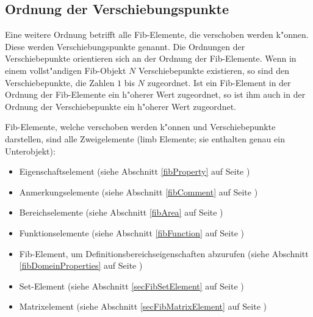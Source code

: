 \subsection{Ordnung der Verschiebungspunkte}

Eine weitere Ordnung betrifft alle Fib-Elemente, die verschoben werden k"onnen. Diese werden Verschiebungspunkte genannt.
Die Ordnungen der Verschiebepunkte orientieren sich an der Ordnung der Fib-Elemente. Wenn in einem vollst"andigen Fib-Objekt $N$ Verschiebepunkte existieren, so sind den Verschiebepunkte, die Zahlen $1$ bis $N$ zugeordnet. Ist ein Fib-Element in der Ordnung der Fib-Elemente ein h"oherer Wert zugeordnet, so ist ihm auch in der Ordnung der Verschiebepunkte ein h"oherer Wert zugeordnet.

\bigskip\noindent
Fib-Elemente, welche verschoben werden k"onnen und Verschiebepunkte darstellen, sind alle Zweigelemente (limb Elemente; sie enthalten genau ein Unterobjekt):
\begin{itemize}
 \item Eigenschaftselement (siehe Abschnitt \ref{fibProperty} auf Seite \pageref{fibProperty})
 \item Anmerkungselemente (siehe Abschnitt \ref{fibComment} auf Seite \pageref{fibComment})
 \item Bereichselemente (siehe Abschnitt \ref{fibArea} auf Seite \pageref{fibArea})
 \item Funktionselemente (siehe Abschnitt \ref{fibFunction} auf Seite \pageref{fibFunction})
 \item Fib-Element, um Definitionsbereichseigenschaften abzurufen (siehe Abschnitt \ref{fibDomeinProperties} auf Seite \pageref{fibDomeinProperties})
 \item Set-Element (siehe Abschnitt \ref{secFibSetElement} auf Seite \pageref{secFibSetElement})
 \item Matrixelement (siehe Abschnitt \ref{secFibMatrixElement} auf Seite \pageref{secFibMatrixElement})
\end{itemize}

